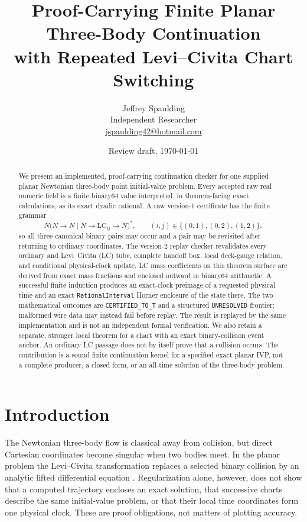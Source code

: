 \documentclass[11pt]{article}
\title{Proof-Carrying Finite Planar Three-Body Continuation\\
with Repeated Levi--Civita Chart Switching}
\author{Jeffrey Spaulding\\
\small Independent Researcher\\
\small \href{mailto:jspaulding42@hotmail.com}{jspaulding42@hotmail.com}}
\date{Review draft, \today}
\newcommand{\LC}{\mathrm{LC}}
\begin{document}
\maketitle

\begin{abstract}
We present an implemented, proof-carrying continuation checker for one
supplied planar Newtonian three-body point initial-value problem.  Every
accepted raw real numeric field is a finite binary64 value interpreted, in
theorem-facing exact calculations, as its exact dyadic rational.  A raw
version-1 certificate has the finite grammar
\[
 N\bigl(N\mathbin{\to}N\mid
 N\mathbin{\to}\LC_{ij}\mathbin{\to}N\bigr)^*,
 \qquad (i,j)\in\{(0,1),(0,2),(1,2)\},
\]
so all three canonical binary pairs may occur and a pair may be revisited
after returning to ordinary coordinates.  The version-2 replay checker
revalidates every ordinary and Levi--Civita (LC) tube, complete handoff box,
local deck-gauge relation, and conditional physical-clock update.  LC mass
coefficients on this theorem surface are derived from exact mass fractions
and enclosed outward in binary64 arithmetic.  A successful finite induction
produces an exact-clock preimage of a requested physical time and an exact
\texttt{RationalInterval} Horner enclosure of the state there.  The two
mathematical outcomes are \texttt{CERTIFIED\_TO\_T} and a structured
\texttt{UNRESOLVED} frontier; malformed wire data may instead fail before
replay.  The result is replayed by the same implementation and is not an
independent formal verification.  We also retain a separate, stronger local
theorem for a chart with an exact binary-collision event anchor.  An ordinary
LC passage does not by itself prove that a collision occurs.  The contribution
is a sound finite continuation kernel for a specified exact planar IVP, not a
complete producer, a closed form, or an all-time solution of the three-body
problem.
\end{abstract}

\section{Introduction}

The Newtonian three-body flow is classical away from collision, but direct
Cartesian coordinates become singular when two bodies meet.  In the planar
problem the Levi--Civita transformation replaces a selected binary collision
by an analytic lifted differential equation
\cite{LeviCivita1920,SiegelMoser1995,Montgomery2024}.  Regularization alone,
however, does not show that a computed trajectory encloses an exact solution,
that successive charts describe the same initial-value problem, or that their
local time coordinates form one physical clock.  These are proof obligations,
not matters of plotting accuracy.
\end{document}
